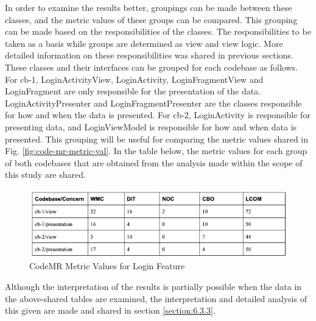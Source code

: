 In order to examine the results better, groupings can be made between these classes, and the metric values of these groups can be compared. This grouping can be made based on the responsibilities of the classes. The responsibilities to be taken as a basis while groups are determined as view and view logic. More detailed information on these responsibilities was shared in previous sections. These classes and their interfaces can be grouped for each codebase as follows. For cb-1, LoginActivityView, LoginActivity, LoginFragmentView and LoginFragment are only responsible for the presentation of the data.  LoginActivityPresenter and LoginFragmentPresenter are the classes responsible for how and when the data is presented. For cb-2, LoginActivity is responsible for presenting data, and LoginViewModel is responsible for how and when data is presented. This grouping will be useful for comparing the metric values shared in Fig. \ref{fig:code-mr-metric-val}. In the table below, the metric values for each group of both codebases that are obtained from the analysis made within the scope of this study are shared.

\begin{figure}[ht!]
    \centering
    \includegraphics[scale=0.65]{figures/login-metric-table-2.png}
    \caption{CodeMR Metric Values for Login Feature}
    \label{fig:login-metric-table-2}
\end{figure}
\FloatBarrier

Although the interpretation of the results is partially possible when the data in the above-shared tables are examined, the interpretation and detailed analysis of this given are made and shared in section \ref{section:6.3.3}.